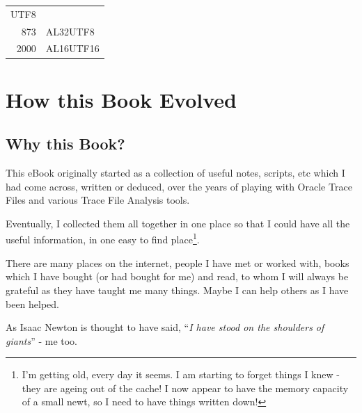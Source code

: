 \begin{appendix}
\begin{longtable}[]{@{}r|l@{}}
\begin{minipage}[t]{0.21\columnwidth}
UTF8\strut
\end{minipage}\tabularnewline
\begin{minipage}[t]{0.09\columnwidth}\raggedright\strut
873\strut
\end{minipage} & \begin{minipage}[t]{0.21\columnwidth}\raggedright\strut
AL32UTF8\strut
\end{minipage}\tabularnewline
\begin{minipage}[t]{0.09\columnwidth}\raggedright\strut
2000\strut
\end{minipage} & \begin{minipage}[t]{0.21\columnwidth}\raggedright\strut
AL16UTF16\strut
\end{minipage}\tabularnewline
\bottomrule
\end{longtable}


\chapter{How this Book Evolved}
\label{how-this-book-evolved}%

\section{Why this Book?}\label{why-this-book}

This eBook originally started as a collection of useful notes, scripts, etc which I had come across, written or deduced, over the years of playing with Oracle Trace Files and various Trace File Analysis tools.

Eventually, I collected them all together in one place so that I could have all the useful information, in one easy to find place\footnote{I'm getting old, every day it seems. I am starting to forget things I knew - they are ageing out of the cache! I now appear to have the memory capacity of a small newt, so I need to have things written down!}.

There are many places on the internet, people I have met or worked with, books which I have bought (or had bought for me) and read, to whom I will always be grateful as they have taught me many things. Maybe I can help others as I have been helped.

As Isaac Newton is thought to have said, ``\emph{I have stood on the shoulders of giants}'' - me too.



\end{appendix}
